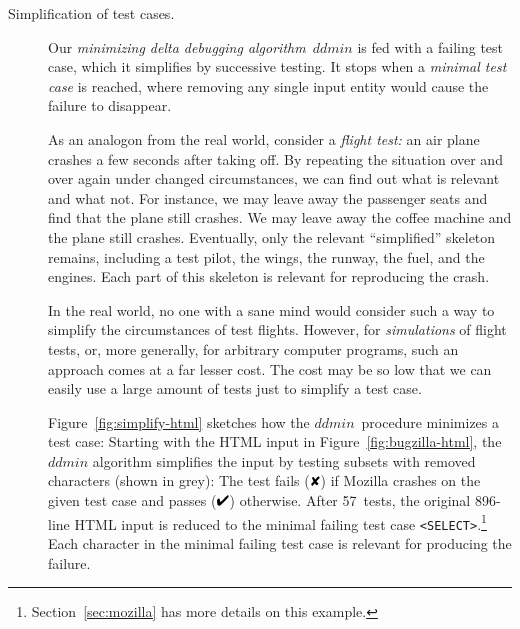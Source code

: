 \documentclass{acm_proc_article-sp}
\newcommand{\HTML}       {{\small HTML}\xspace}
\newcommand{\PASS}{\text{\ding{52}}\xspace}
\newcommand{\FAIL}{\text{\ding{56}}\xspace}
\newcommand{\ddmin}{\textit{ddmin}\xspace}
\theoremstyle{plain}
\let\oldfootnote=\footnote
\renewcommand{\footnote}[1]{\oldfootnote{\let\small=\scriptsize #1}}
\begin{document}
\begin{description}
  
\item[Simplification of test cases.]  Our \emph{minimizing delta
    debugging algorithm}~$\ddmin$ is fed with a failing test case,
  which it simplifies by successive testing.  It stops when a
  \emph{minimal test case} is reached, where removing any single input
  entity would cause the failure to disappear.
  
  As an analogon from the real world, consider a \emph{flight test:}
  an air plane crashes a few seconds after taking off.  By repeating
  the situation over and over again under changed circumstances, we
  can find out what is relevant and what not.  For instance, we may
  leave away the passenger seats and find that the plane still
  crashes.  We may leave away the coffee machine and the plane still
  crashes.  Eventually, only the relevant ``simplified'' skeleton
  remains, including a test pilot, the wings, the runway, the fuel,
  and the engines.  Each part of this skeleton is relevant for
  reproducing the crash.
  
  In the real world, no one with a sane mind would consider such a way
  to simplify the circumstances of test flights.  However, for
  \emph{simulations} of flight tests, or, more generally, for
  arbitrary computer programs, such an approach comes at a far lesser
  cost.  The cost may be so low that we can easily use a large amount
  of tests just to simplify a test case.
  
  Figure~\ref{fig:simplify-html} sketches how the $\ddmin$~procedure
  minimizes a test case: Starting with the \HTML input in
  Figure~\ref{fig:bugzilla-html}, the $\ddmin$ algorithm simplifies
  the input by testing subsets with removed characters (shown in
  grey): The test fails ($\FAIL$) if Mozilla crashes on the given test
  case and passes ($\PASS$) otherwise.  After 57~tests, the original
  896-line \HTML input is reduced to the minimal failing test case
  \texttt{<SELECT>}.\footnote{Section~\ref{sec:mozilla} has more
    details on this example.}  Each character in the minimal failing
  test case is relevant for producing the failure.

\begin{figure}[t]
\renewcommand{\a}[1]{%
{\textbf{\color{black}#1}}}
\newcommand{\n}[1]{{\tiny #1}}
\renewcommand{\t}[1]{\texttt{\color{grey}#1}}
\scriptsize


\end{figure}
\end{description}
\end{document}
